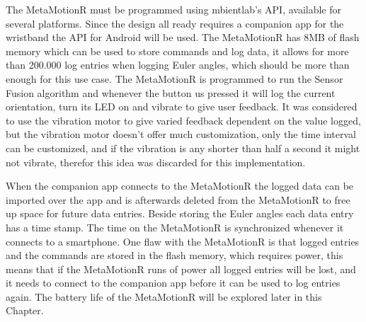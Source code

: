 The MetaMotionR must be programmed using mbientlab's API, available for several platforms\cite{api_mbient}. Since the design all ready requires a companion app for the wristband the API for Android will be used. The MetaMotionR has 8MB of flash memory which can be used to store commands and log data, it allows for more than 200.000 log entries when logging Euler angles, which should be more than enough for this use case. The MetaMotionR is programmed to run the Sensor Fusion algorithm and whenever the button us pressed it will log the current orientation, turn its LED on and vibrate to give user feedback. It was considered to use the vibration motor to give varied feedback dependent on the value logged, but the vibration motor doesn't offer much customization, only the time interval can be customized, and if the vibration is any shorter than half a second it might not vibrate, therefor this idea was discarded for this implementation.

When the companion app connects to the MetaMotionR the logged data can be imported over the app and is afterwards deleted from the MetaMotionR to free up space for future data entries. Beside storing the Euler angles each data entry has a time stamp. The time on the MetaMotionR is synchronized whenever it connects to a smartphone. One flaw with the MetaMotionR is that logged entries and the commands are stored in the flash memory, which requires power, this means that if the MetaMotionR runs of power all logged entries will be lost, and it needs to connect to the companion app before it can be used to log entries again. The battery life of the MetaMotionR will be explored later in this Chapter. 

